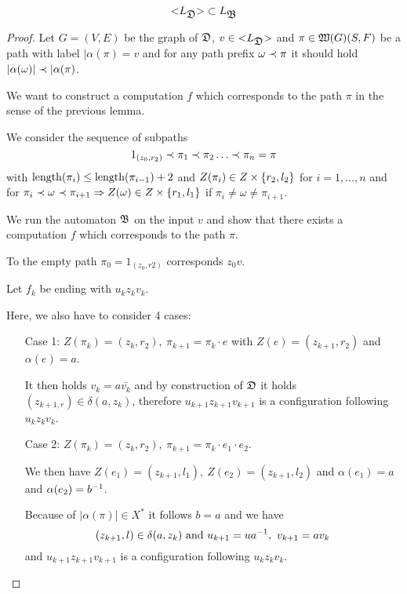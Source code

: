 \bigskip
\begin{lemma}
\[ \mbox{${<}{L_{\mbox{$\mathfrak{D}$}}}{>}$} \subset L_{\mbox{$\mathfrak{B}$}} \]
\end{lemma}

\begin{proof}
Let $G = (V, E)$ be the graph of $\mbox{$\mathfrak{D}$}$, $v \in \mbox{${<}{L_{\mbox{$\mathfrak{D}$}}}{>}$}$ and
$\pi \in \mbox{$\mathfrak{W}({G})$}(S, F)$ be a path with label $|\alpha(\pi) = v$ and for any
path prefix $\omega \prec \pi$ it should hold $|\alpha(\omega)| \prec
|\alpha(\pi)$.

We want to construct a computation $f$ which corresponds to the path $\pi$ in
the sense of the previous lemma.

We consider the sequence of subpaths
\[ 1_{(z_0, r_2)} \prec \pi_1 \prec \pi_2 \ldots \prec \pi_n = \pi \]
with $\mathrm{length}({\pi_i}) \leq \mathrm{length}({\pi_{i-1}}) + 2$ and $Z(\pi_i) \in Z \times
\mbox{$\{r_2, l_2\}$}$ for $i = 1, \ldots, n$ and for $\pi_i \prec \omega \prec
\pi_{i+1} \Rightarrow Z(\omega) \in Z \times \mbox{$\{r_1, l_1\}$}$ if $\pi_i
\neq \omega \neq \pi_{i+1}$.

We run the automaton $\mbox{$\mathfrak{B}$}$ on the input $v$ and show that there exists a
computation $f$ which corresponds to the path $\pi$.

\medskip
To the empty path $\pi_0 = 1_{(z_0, r2)}$ corresponds $z_0 v$.

Let $f_k$ be ending with $u_k z_k v_k$.

Here, we also have to consider 4 cases:

\begin{itemize}
  \item[Case 1:] $Z(\pi_k) = (z_k, r_2),\ \pi_{k+1} = \pi_k \cdot e$ with $Z(e)
  = (z_{k+1}, r_2)$ and $\alpha(e) = a$.
  
  It then holds $v_k = a \bar{v_k}$ and by construction of $\mbox{$\mathfrak{D}$}$ it holds
  $(z_{k+1, r}) \in \delta(a, z_k)$, therefore $u_{k+1} z_{k+1} v_{k+1}$ is a
  configuration following $u_{k} z_{k} v_{k}$.
   
  \item[Case 2:] $Z(\pi_k) = (z_k, r_2),\ \pi_{k+1} = \pi_k \cdot e_1 \cdot
  e_2$.
  
  We then have $Z(e_1) = (z_{k+1}, l_1),\ Z(e_2) = (z_{k+1}, l_2)$ and
  $\alpha(e_1) = a$ and $\alpha(e_2) = {{b}^{-1}}$.
  
  Because of $|\alpha(\pi)| \in X^*$ it follows $b = a$ and we have
  \[ (z_{k+1}, l) \in \delta(a, z_k)\text{ and }u_{k+1} = u {{a}^{-1}},\ v_{k+1} =
  a v_k \]
  and $u_{k+1} z_{k+1} v_{k+1}$ is a configuration following $u_{k} z_{k} v_{k}$.
  

\end{itemize}
\end{proof}
